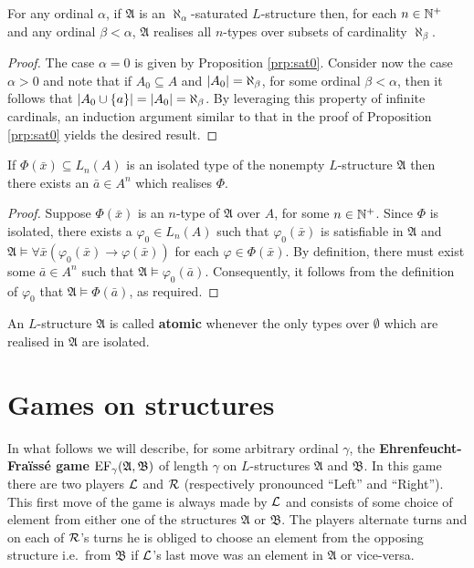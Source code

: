 \begin{prp}
	For any ordinal $\alpha$, if $\mathfrak{A}$ is an $\aleph_\alpha$-saturated $L$-structure then, for each $n\in\mathbb{N}^{+}$ and any ordinal $\beta<\alpha$, $\mathfrak{A}$ realises all $n$-types over subsets of cardinality $\aleph_\beta$.
\end{prp}
\begin{proof}
	The case $\alpha=0$ is given by Proposition \ref{prp:sat0}.  Consider now the case $\alpha>0$ and note that if $A_0\subseteq A$ and $\left\lvert A_0\right\rvert=\aleph_\beta$, for some ordinal $\beta<\alpha$, then it follows that $\left\lvert A_0\cup\lbrace a\rbrace\right\rvert=\left\lvert A_0\right\rvert=\aleph_\beta$.  By leveraging this property of infinite cardinals, an induction argument similar to that in the proof of Proposition \ref{prp:sat0} yields the desired result.
\end{proof}

\begin{prp}
	If $\Phi(\bar{x})\subseteq L_n(A)$ is an isolated type of the nonempty $L$-structure $\mathfrak{A}$ then there exists an $\bar{a}\in A^n$ which realises $\Phi$.
\end{prp}
\begin{proof}
	Suppose $\Phi(\bar{x})$ is an $n$-type of $\mathfrak{A}$ over $A$, for some $n\in\mathbb{N}^{+}$.  Since $\Phi$ is isolated, there exists a $\varphi_0\in L_n(A)$ such that $\varphi_0(\bar{x})$ is satisfiable in $\mathfrak{A}$ and $\mathfrak{A}\models\forall\bar{x}(\varphi_0(\bar{x})\rightarrow\varphi(\bar{x}))$ for each $\varphi\in\Phi(\bar{x})$.  By definition, there must exist some $\bar{a}\in A^n$ such that $\mathfrak{A}\models\varphi_0(\bar{a})$.  Consequently, it follows from the definition of $\varphi_0$ that $\mathfrak{A}\models\Phi(\bar{a})$, as required.
\end{proof}

\begin{dfn}[Atomicity]
	An $L$-structure $\mathfrak{A}$ is called \textbf{atomic} whenever the only types over $\emptyset$ which are realised in $\mathfrak{A}$ are isolated.
\end{dfn}


\section{Games on structures}

In what follows we will describe, for some arbitrary ordinal $\gamma$, the \textbf{Ehrenfeucht-Fra\"iss\'e game} $\operatorname{EF}_\gamma(\mathfrak{A},\mathfrak{B})$ of length $\gamma$ on $L$-structures $\mathfrak{A}$ and $\mathfrak{B}$.  In this game there are two players $\mathcal{L}$ and $\mathcal{R}$ (respectively pronounced ``Left'' and ``Right'').  This first move of the game is always made by $\mathcal{L}$ and consists of some choice of element from either one of the structures $\mathfrak{A}$ or $\mathfrak{B}$.  The players alternate turns and on each of  $\mathcal{R}$'s turns he is obliged to choose an element from the opposing structure i.e.\ from $\mathfrak{B}$ if $\mathcal{L}$'s last move was an element in $\mathfrak{A}$ or vice-versa.

